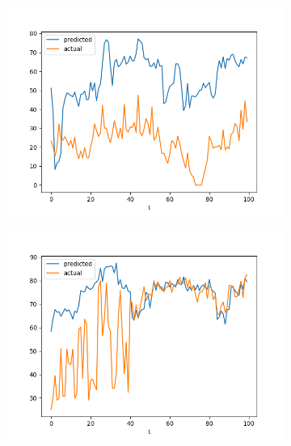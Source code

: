 \documentclass[runningheads]{llncs}
\begin{document}
\begin{figure}[hp]
\begin{subfigure}{\figwidth}
                \includegraphics[width=\textwidth]{results/evaluation/f_model_graph_p70.png}
        \end{subfigure}
        \begin{subfigure}{\figwidth}
                \includegraphics[width=\textwidth]{results/evaluation/f_model_graph_p80.png}
        \end{subfigure}
        \begin{subfigure}{\figwidth}

\end{subfigure}
\end{figure}
\end{document}

